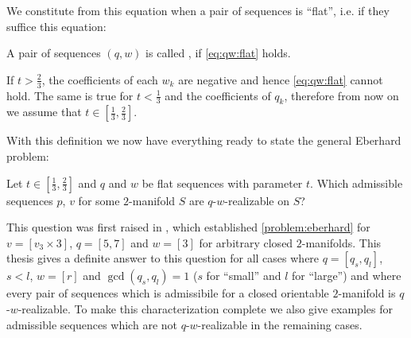 We constitute from this equation when a pair of sequences is ``flat'', i.e. if they suffice this equation:

\begin{definition}
  A pair of sequences $(q, w)$ is called , if \eqref{eq:qw:flat} holds.
\end{definition}

If $t > \frac{2}{3}$, the coefficients of each $w_k$ are negative and hence \eqref{eq:qw:flat} cannot hold. The same is true for $t < \frac{1}{3}$ and the coefficients of $q_k$, therefore from now on we assume that $t \in \left[\frac{1}{3}, \frac{2}{3}\right]$.

With this definition we now have everything ready to state the general {\sc Eberhard} problem:

\begin{problem}\label{problem:eberhard}
  Let $ t \in \left[\frac{1}{3}, \frac{2}{3}\right]$ and $q$ and $w$ be flat sequences with parameter $t$. Which admissible sequences $p$, $v$ for some $2$-manifold $S$ are $q$-$w$-realizable on $S$?
\end{problem}

This question was first raised in \cite{devos2010eberhard}, which established \autoref{problem:eberhard} for $v = [v_3 \times 3]$, $q = [5, 7]$ and $w = [3]$ for arbitrary closed $2$-manifolds. This thesis gives a definite answer to this question for all cases where $q = [q_s, q_l]$, $s < l$, $w = [r]$ and $\gcd(q_s, q_l) = 1$ ($s$ for ``small'' and $l$ for ``large'') and where every pair of sequences which is admissibile for a closed orientable $2$-manifold is $q$-$w$-realizable. To make this characterization complete we also give examples for admissible sequences which are not $q$-$w$-realizable in the remaining cases.

